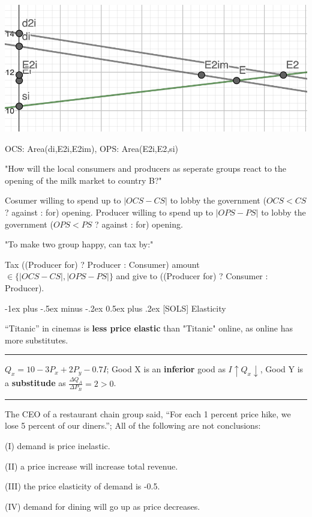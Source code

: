 \documentclass[a4paper]{article}
\makeatletter
\renewcommand{\section}{\@startsection{section}{1}{0mm}%
                                {-1ex plus -.5ex minus -.2ex}%
                                {0.5ex plus .2ex}%
                                {\normalfont\small\bfseries}}
\makeatother
\begin{document}
\begin{multicols*}{3}
        \includegraphics[width=.8\linewidth]{./i2.png}

        OCS: Area(di,E2i,E2im), OPS: Area(E2i,E2,si)

        "How will the local consumers and producers as seperate groups react to the opening of the milk market to country B?"

        Cosumer willing to spend up to $|OCS-CS|$ to lobby the government ($OCS < CS$ ? against : for) opening.
        Producer willing to spend up to $|OPS-PS|$ to lobby the government ($OPS < PS$ ? against : for) opening.

        "To make two group happy, can tax by:"

        Tax ((Producer for) ? Producer : Consumer) amount $\in \{|OCS-CS|, |OPS-PS|\}$ and give to ((Producer for) ? Consumer : Producer).

        \section{[SOLS] Elasticity}

        “Titanic” in cinemas is \textbf{less price elastic} than "Titanic" online, as online has more substitutes.

        \rule{1\linewidth}{0.4pt}

    $Q_x=10-3P_x+2P_y-0.7I$; Good X is an \textbf{inferior} good as $I\uparrow Q_x\downarrow$, Good Y is a \textbf{substitude} as $\frac{\Delta Q_A}{\Delta P_B} = 2 > 0$.

        \rule{1\linewidth}{0.4pt}

        The CEO of a restaurant chain group said, “For each 1 percent price hike, we lose 5 percent of our diners.”; All of the following are not conclusions:

        (I) demand is price inelastic.

        (II) a price increase will increase total revenue.

        (III) the price elasticity of demand is -0.5.

        (IV) demand for dining will go up as price decreases.


\end{multicols*}
\end{document}

